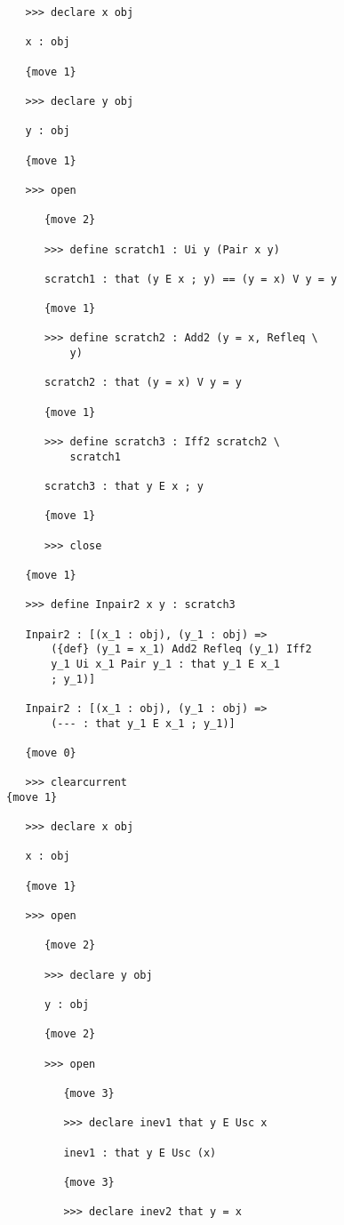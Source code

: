 \documentclass[12pt]{article}
\begin{document}
\begin{verbatim}
   >>> declare x obj

   x : obj

   {move 1}

   >>> declare y obj

   y : obj

   {move 1}

   >>> open

      {move 2}

      >>> define scratch1 : Ui y (Pair x y)

      scratch1 : that (y E x ; y) == (y = x) V y = y

      {move 1}

      >>> define scratch2 : Add2 (y = x, Refleq \
          y)

      scratch2 : that (y = x) V y = y

      {move 1}

      >>> define scratch3 : Iff2 scratch2 \
          scratch1

      scratch3 : that y E x ; y

      {move 1}

      >>> close

   {move 1}

   >>> define Inpair2 x y : scratch3

   Inpair2 : [(x_1 : obj), (y_1 : obj) => 
       ({def} (y_1 = x_1) Add2 Refleq (y_1) Iff2 
       y_1 Ui x_1 Pair y_1 : that y_1 E x_1 
       ; y_1)]

   Inpair2 : [(x_1 : obj), (y_1 : obj) => 
       (--- : that y_1 E x_1 ; y_1)]

   {move 0}

   >>> clearcurrent
{move 1}

   >>> declare x obj

   x : obj

   {move 1}

   >>> open

      {move 2}

      >>> declare y obj

      y : obj

      {move 2}

      >>> open

         {move 3}

         >>> declare inev1 that y E Usc x

         inev1 : that y E Usc (x)

         {move 3}

         >>> declare inev2 that y = x


\end{verbatim}
\end{document}
